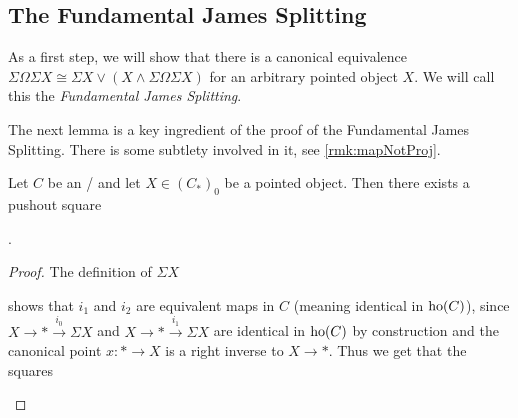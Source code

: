 \subsection*{The Fundamental James Splitting}
As a first step, we will show that there is a canonical equivalence $\Sigma\Omega\Sigma X\cong\Sigma X\vee\left(X\wedge\Sigma\Omega\Sigma X\right)$ for an arbitrary pointed object $X$.
We will call this the \emph{Fundamental James Splitting}.

The next lemma is a key ingredient of the proof of the Fundamental James Splitting.
There is some subtlety involved in it, see \cref{rmk:mapNotProj}.
\begin{lemma}\label{lem:existenceOfPoSq}
    Let $C$ be an \inftytop/ and let $X\in \left(C_*\right)_0$ be a pointed object.
    Then there exists a pushout square  
    \begin{center}
        \;.
    \end{center}
    \begin{proof}
        The definition of $\Sigma X$
        \begin{center}
        \end{center}
        shows that $i_1$ and $i_2$ are equivalent maps in $C$ (meaning identical in $\operatorname{ho}(C)$), since $X\to *\xrightarrow{i_0}\Sigma X$ and $X\to *\xrightarrow{i_1}\Sigma X$ are identical in $\operatorname{ho}(C)$ by construction and the canonical point $x\colon*\to X$ is a right inverse to $X\to *$.
        Thus we get that the squares
        \begin{center}

\end{center}
\end{proof}
\end{lemma}
